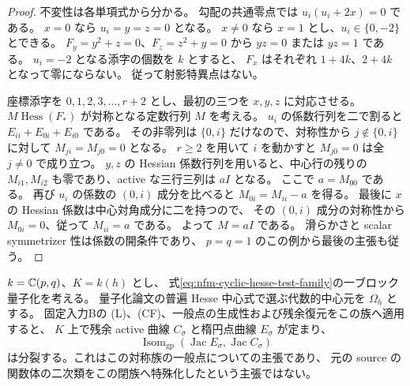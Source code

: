 \begin{proof}
不変性は各単項式から分かる。
勾配の共通零点では $u_i(u_i+2x)=0$ である。
$x=0$ なら $u_i=y=z=0$ となる。
$x\ne0$ なら $x=1$ とし、$u_i\in\{0,-2\}$ とできる。
$F_y=y^2+z=0$、$F_z=z^2+y=0$ から $yz=0$ または $yz=1$ である。
$u_i=-2$ となる添字の個数を $k$ とすると、
$F_x$ はそれぞれ $1+4k$、$2+4k$ となって零にならない。
従って射影特異点はない。

座標添字を $0,1,2,3,\ldots,r+2$ とし、最初の三つを $x,y,z$ に対応させる。
$M\operatorname{Hess}(F_*)$ が対称となる定数行列 $M$ を考える。
$u_i$ の係数行列を二で割ると
$E_{ii}+E_{0i}+E_{i0}$ である。
その非零列は $\{0,i\}$ だけなので、対称性から
$j\notin\{0,i\}$ に対して $M_{ji}=M_{j0}=0$ となる。
$r\ge2$ を用いて $i$ を動かすと $M_{j0}=0$ は全 $j\ne0$ で成り立つ。
$y,z$ の Hessian 係数行列を用いると、中心行の残りの
$M_{i1},M_{i2}$ も零であり、active な三行三列は $aI$ となる。
ここで $a=M_{00}$ である。
再び $u_i$ の係数の $(0,i)$ 成分を比べると
$M_{0i}=M_{ii}-a$ を得る。
最後に $x$ の Hessian 係数は中心対角成分に二を持つので、
その $(0,i)$ 成分の対称性から $M_{0i}=0$、従って $M_{ii}=a$ である。
よって $M=aI$ である。
滑らかさと scalar symmetrizer 性は係数の開条件であり、
$p=q=1$ のこの例から最後の主張も従う。
\end{proof}

\begin{proposition}[対称族自身における符号被覆の分裂]
\label{prop:nfm-cyclic-test-sign-split}
$k=\mathbb C(p,q)$、$K=k(h)$ とし、
式\eqref{eq:nfm-cyclic-hesse-test-family}の一ブロック量子化を考える。
量子化論文\cite{CubicQuantization}の普遍 Hesse 中心式で選ぶ代数的中心元を $\Omega_h$ とする。
固定入力Bの (L)、(CF)、一般点の生成性および残余復元をこの族へ適用すると、
$K$ 上で残余 active 曲線 $C_\sigma$ と楕円点曲線 $E_\sigma$ が定まり、
\[
 \operatorname{Isom}_{\mathrm{gp}}
    (\operatorname{Jac}E_\sigma,\operatorname{Jac}C_\sigma)
\]
は分裂する。これはこの対称族の一般点についての主張であり、
元の source の関数体の二次類をこの閉族へ特殊化したという主張ではない。
\end{proposition}

